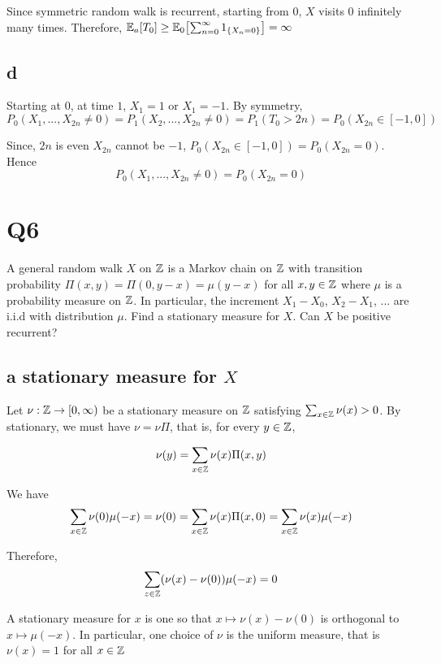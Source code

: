 \documentclass{article}
\begin{document}
Since symmetric random walk is recurrent, starting from $0$, $X$ visits $0$ infinitely many times. Therefore, $\Exp_a[T_0] \geq \Exp_0\bracket*{\sum_{n=0}^\infty 1_{\set{X_n=0}}} = \infty$

\subsection{d}

Starting at $0$, at time $1$, $X_1 = 1$ or $X_1 = -1$. By symmetry, 
$$
    P_0(X_1, ..., X_{2n} \neq 0) = P_1(X_2, ..., X_{2n} \neq 0) = P_1(T_0 > 2n) = P_0(X_{2n} \in [-1, 0])
$$

Since, $2n$ is even $X_{2n}$ cannot be $-1$, $P_0(X_{2n} \in [-1, 0]) = P_0(X_{2n} = 0)$. Hence
$$
    P_0(X_1, ..., X_{2n} \neq 0) = P_0(X_{2n} = 0)
$$

\section{Q6}

A general random walk $X$ on $\mathbb{Z}$ is a Markov chain on $\mathbb{Z}$ with transition probability $\Pi(x, y) = \Pi(0, y-x) = \mu(y - x)$ for all $x, y \in \mathbb{Z}$ where $\mu$ is a probability measure on $\mathbb{Z}$. In particular, the increment $X_1 - X_0$, $X_2 - X_1$, ... are i.i.d with distribution $\mu$. Find a stationary measure for $X$. Can $X$ be positive recurrent?

\subsection{a stationary measure for $X$}

Let $\nu: \mathbb{Z} \to [0, \infty)$ be a stationary measure on $\mathbb{Z}$ satisfying $\sum_{x \in \mathbb{Z}} \nu(x) > 0$. By stationary, we must have $\nu = \nu \Pi$, that is, for every $y \in \mathbb{Z}$,

$$
    \nu(y) = \sum_{x \in \mathbb{Z}} \nu(x) \Pi(x, y)
$$


We have
\begin{align*}
    \sum_{x \in \mathbb{Z}} \nu(0) \mu(-x)
    = \nu(0) 
    = \sum_{x \in \mathbb{Z}} \nu(x) \Pi(x, 0)
    = \sum_{x \in \mathbb{Z}} \nu(x) \mu(-x)
\end{align*}

Therefore,
$$
    \sum_{z \in \mathbb{Z}} (\nu(x) - \nu(0)) \mu(-x) = 0
$$

A stationary measure for $x$ is one so that $x \mapsto \nu(x) - \nu(0)$ is orthogonal to $x \mapsto \mu(-x)$. In particular, one choice of $\nu$ is the uniform measure, that is $\nu(x) = 1$ for all $x \in \mathbb{Z}$
\end{document}
